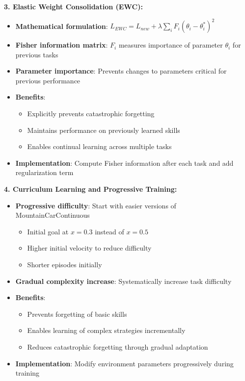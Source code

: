 \documentclass[12pt]{article}
\begin{document}
{{{\textbf{3. Elastic Weight Consolidation (EWC):}
\begin{itemize}
    \item \textbf{Mathematical formulation}: $L_{EWC} = L_{new} + \lambda \sum_i F_i (\theta_i - \theta_i^*)^2$
    \item \textbf{Fisher information matrix}: $F_i$ measures importance of parameter $\theta_i$ for previous tasks
    \item \textbf{Parameter importance}: Prevents changes to parameters critical for previous performance
    \item \textbf{Benefits}:
    \begin{itemize}
        \item Explicitly prevents catastrophic forgetting
        \item Maintains performance on previously learned skills
        \item Enables continual learning across multiple tasks
    \end{itemize}
    \item \textbf{Implementation}: Compute Fisher information after each task and add regularization term
\end{itemize}

\textbf{4. Curriculum Learning and Progressive Training:}
\begin{itemize}
    \item \textbf{Progressive difficulty}: Start with easier versions of MountainCarContinuous
    \begin{itemize}
        \item Initial goal at $x = 0.3$ instead of $x = 0.5$
        \item Higher initial velocity to reduce difficulty
        \item Shorter episodes initially
    \end{itemize}
    \item \textbf{Gradual complexity increase}: Systematically increase task difficulty
    \item \textbf{Benefits}: 
    \begin{itemize}
        \item Prevents forgetting of basic skills
        \item Enables learning of complex strategies incrementally
        \item Reduces catastrophic forgetting through gradual adaptation
    \end{itemize}
    \item \textbf{Implementation}: Modify environment parameters progressively during training
\end{itemize}

}}}
\end{document}
